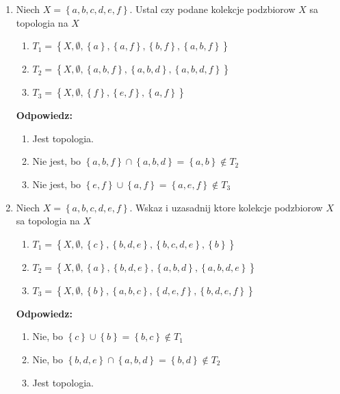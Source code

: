 \documentclass{article}
\begin{document}
\begin{enumerate}
\item Niech $X = \left\{a,b,c,d,e,f\right\}.$ Ustal czy podane kolekcje podzbiorow $X$ sa topologia na $X$

\begin{enumerate}[label=(\alph*)]
\item $T_{1} = \left\{X, \emptyset, \left\{a\right\}, \left\{a,f\right\}, \left\{b,f\right\}, \left\{a,b,f\right\}\right\}$
\item  $T_{2} = \left\{X, \emptyset, \left\{a,b,f\right\}, \left\{a,b,d\right\}, \left\{a,b,d,f\right\}\right\}$
\item $T_{3} = \left\{X, \emptyset, \left\{f\right\}, \left\{e,f\right\}, \left\{a,f\right\} \right\}$
    
\end{enumerate}
\textbf{Odpowiedz:}
\begin{enumerate}[label=(\alph*)]
\item Jest topologia.
\item Nie jest, bo $\left\{a,b,f\right\} \cap \left\{a,b,d\right\}= \left\{a,b\right\} \notin T_{2}$ 
\item Nie jest, bo $\left\{e,f\right\} \cup \left\{a,f\right\}=\left\{a,e,f\right\} \notin T_{3}$ 
    
\end{enumerate} 
\item Niech $X = \left\{a,b,c,d,e,f\right\}.$ Wskaz i uzasadnij ktore kolekcje podzbiorow $X$ sa topologia na $X$

\begin{enumerate}[label=(\alph*)]
\item $T_{1} = \left\{X, \emptyset, \left\{c\right\}, \left\{b,d,e\right\}, \left\{b,c,d,e\right\}, \left\{b\right\}\right\}$
\item  $T_{2} = \left\{X, \emptyset,\left\{a\right\}, \left\{b,d,e\right\}, \left\{a,b,d\right\}, \left\{a,b,d,e\right\}\right\}$
\item $T_{3} = \left\{X, \emptyset,\left\{b\right\}, \left\{a,b,c\right\}, \left\{d,e,f\right\}, \left\{b,d,e,f\right\} \right\}$
 
\end{enumerate}

\textbf{Odpowiedz:}

\begin{enumerate}[label=(\alph*)]
\item Nie, bo $\left\{c\right\} \cup \left\{b\right\} = \left\{b,c\right\} \notin T_{1}$
\item Nie, bo $\left\{b,d,e\right\} \cap \left\{a,b,d\right\} = \left\{b,d\right\} \notin T_{2}$
\item Jest topologia.
\end{enumerate}


\end{enumerate}
\end{document}
